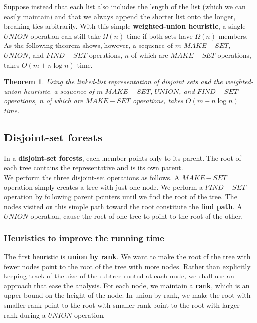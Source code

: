 \documentclass[12pt]{article}
\newtheorem{theorem}{Theorem}
\begin{document}
Suppose instead that each list also includes the length of the list (which we can easily maintain) and that we always append the shorter list onto the longer, breaking ties arbitrarily. With this simple \textbf{weighted-union heuristic}, a single $UNION$ operation can still take $\Omega(n)$ time if both sets have $\Omega(n)$ members. As the following theorem shows, however, a sequence of $m$ $MAKE-SET$, $UNION$, and $FIND-SET$ operations, $n$ of which are $MAKE-SET$ operations, takes $O(m + n \log n)$ time.

\begin{theorem}
  Using the linked-list representation of disjoint sets and the weighted-union heuristic, a sequence of $m$ $MAKE-SET$, $UNION$, and $FIND-SET$ operations, $n$ of which are $MAKE-SET$ operations, takes $O(m + n \log n)$ time.
\end{theorem}

\subsection{Disjoint-set forests}

In a \textbf{disjoint-set forests}, each member points only to its parent. The root of each tree contains the representative and is its own parent. \\

We perform the three disjoint-set operations as follows. A $MAKE-SET$ operation simply creates a tree with just one node. We perform a $FIND-SET$ operation by following parent pointers until we find the root of the tree. The nodes visited on this simple path toward the root constitute the \textbf{find path}. A $UNION$ operation, cause the root of one tree to point to the root of the other.

\subsubsection*{Heuristics to improve the running time}

The first heuristic is \textbf{union by rank}. We want to make the root of the tree with fewer nodes point to the root of the tree with more nodes. Rather than explicitly keeping track of the size of the subtree rooted at each node, we shall use an approach that ease the analysis. For each node, we maintain a \textbf{rank}, which is an upper bound on the height of the node. In union by rank, we make the root with smaller rank point to the root with smaller rank point to the root with larger rank during a $UNION$ operation. \\
\end{document}
